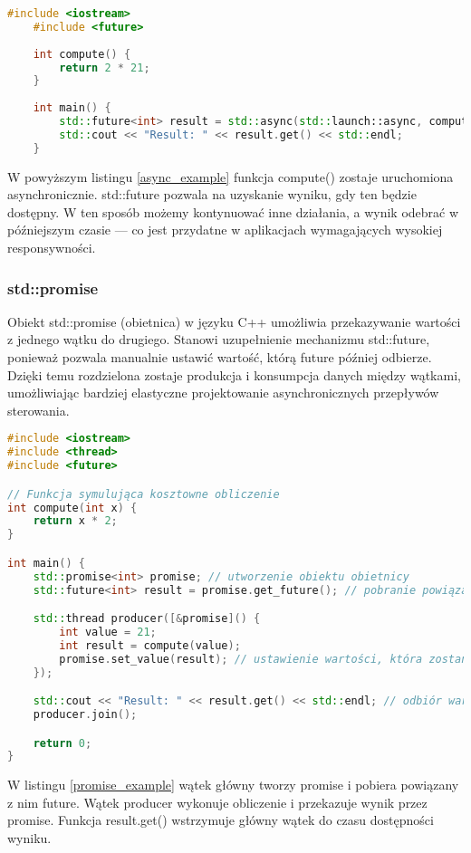 \begin{lstlisting}[language=C++, caption={Przykład użycia std::async}, label={async_example}]
    #include <iostream>
    #include <future>
    
    int compute() {
        return 2 * 21;
    }
    
    int main() {
        std::future<int> result = std::async(std::launch::async, compute);
        std::cout << "Result: " << result.get() << std::endl;
    }
\end{lstlisting}
W powyższym listingu \ref{async_example} funkcja compute() zostaje uruchomiona asynchronicznie. std::future pozwala na uzyskanie wyniku, gdy ten będzie dostępny. W ten sposób możemy kontynuować inne działania, a wynik odebrać w późniejszym czasie — co jest przydatne w aplikacjach wymagających wysokiej responsywności.

\subsubsection{std::promise}
Obiekt std::promise (obietnica) w języku C++ umożliwia przekazywanie wartości z jednego wątku do drugiego. Stanowi uzupełnienie mechanizmu std::future, ponieważ pozwala manualnie ustawić wartość, którą future później odbierze. Dzięki temu rozdzielona zostaje produkcja i konsumpcja danych między wątkami, umożliwiając bardziej elastyczne projektowanie asynchronicznych przepływów sterowania.
\begin{lstlisting}[language=C++, caption={Przykład użycia std::promise}, label={promise_example}]
#include <iostream>
#include <thread>
#include <future>

// Funkcja symulująca kosztowne obliczenie
int compute(int x) {
    return x * 2;
}

int main() {
    std::promise<int> promise; // utworzenie obiektu obietnicy
    std::future<int> result = promise.get_future(); // pobranie powiązanego future

    std::thread producer([&promise]() {
        int value = 21;
        int result = compute(value);
        promise.set_value(result); // ustawienie wartości, która zostanie odebrana przez future
    });

    std::cout << "Result: " << result.get() << std::endl; // odbiór wartości, blokuje do czasu jej ustawienia
    producer.join();

    return 0;
}
\end{lstlisting}    
W listingu \ref{promise_example} wątek główny tworzy promise i pobiera powiązany z nim future. Wątek producer wykonuje obliczenie i przekazuje wynik przez promise. Funkcja result.get() wstrzymuje główny wątek do czasu dostępności wyniku.
